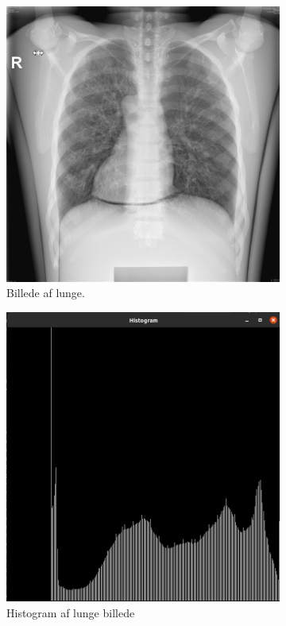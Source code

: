 \documentclass{article}
\begin{document}
\begin{figure}[!h]
  \begin{subfigure}[b]{0.49\linewidth}
    \includegraphics[width=\linewidth]{Image/lung.png}
    \caption{Billede af lunge.}
    \label{fig:f1}
  \end{subfigure}
  \hfill
  \begin{subfigure}[b]{0.49\linewidth}
    \includegraphics[width=\linewidth]{Image/Histogram.png}
    \caption{Histogram af lunge billede}
    \label{fig:f2}
  \end{subfigure}
      \caption{}
    \label{fig:image1}
\end{figure}
\end{document}
